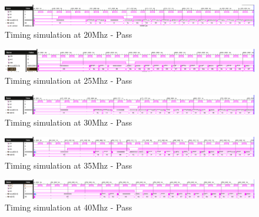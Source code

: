 \documentclass[CMPE]{../KGCOEReport}
\begin{document}
	\begin{figure}[h!]
        \centering
        \includegraphics[width=\textwidth]{img/impl_20Mhz}
        \caption{Timing simulation at 20Mhz - Pass}
        \label{fig:demo1}
	\end{figure}
    
	\begin{figure}[h!]
        \centering
        \includegraphics[width=\textwidth]{img/impl_25Mhz}
        \caption{Timing simulation at 25Mhz - Pass}
        \label{fig:demo1}
	\end{figure}
    
	\begin{figure}[h!]
        \centering
        \includegraphics[width=\textwidth]{img/impl_30Mhz}
        \caption{Timing simulation at 30Mhz - Pass}
        \label{fig:demo1}
	\end{figure}
    
	\begin{figure}[h!]
        \centering
        \includegraphics[width=\textwidth]{img/impl_35Mhz}
        \caption{Timing simulation at 35Mhz - Pass}
        \label{fig:demo1}
	\end{figure}
    
	\begin{figure}[h!]
        \centering
        \includegraphics[width=\textwidth]{img/impl_40Mhz}
        \caption{Timing simulation at 40Mhz - Pass}
        \label{fig:demo1}
	\end{figure}
    
\end{document}
